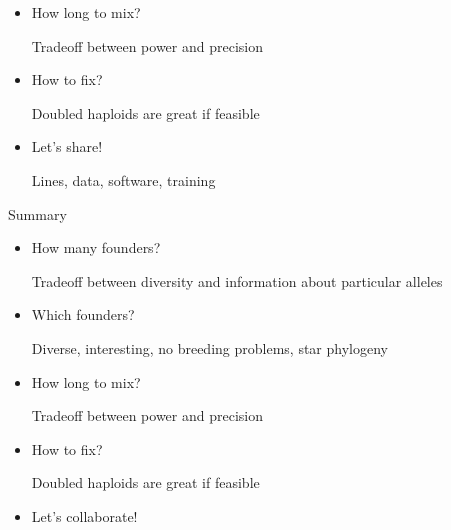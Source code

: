 \documentclass[12pt]{article}
\newcommand{\headsize}{\fontsize{35}{35} \selectfont}
\newcommand{\smallsize}{\fontsize{25}{30} \selectfont}
\newcommand{\smallersize}{\fontsize{20}{25} \selectfont}
\begin{document}
{\begin{minipage}{10in}
\begin{itemize}
{\smallersize \color{myblue} Diverse, interesting, no breeding
  problems, star phylogeny}

\item How long to mix?

{\smallersize \color{myblue} Tradeoff between {\color{mypink} power}
  and {\color{mypink} precision}}

\item How to fix?

{\smallersize \color{myblue} Doubled haploids are great if feasible}

\item Let's share!

{\smallersize \color{myblue} Lines, data, software, training}


\end{itemize}
\end{minipage}


\newpage

\addtocounter{page}{-1}

\headsize \color{myyellow}
\hfill \begin{minipage}{5.75in}
\centering
Summary
\end{minipage}

\vspace{15mm}

\color{mywhite}
\smallsize

\hfill \begin{minipage}{10in}
\begin{itemize}
\itemsep24pt
\item How many founders?

{\smallersize \color{myblue} Tradeoff between {\color{mypink} diversity} and information about
  {\color{mypink} particular alleles}}

\item Which founders?

{\smallersize \color{myblue} Diverse, interesting, no breeding
  problems, star phylogeny}

\item How long to mix?

{\smallersize \color{myblue} Tradeoff between {\color{mypink} power}
  and {\color{mypink} precision}}

\item How to fix?

{\smallersize \color{myblue} Doubled haploids are great if feasible}

\item Let's {\color{mypink} collaborate}!


\end{itemize}
\end{minipage}}
\end{document}
